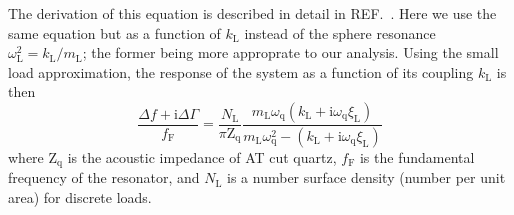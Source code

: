 \documentclass[floatfix,superscriptaddress,a4paper,notitlepage]{revtex4-1}
\newcommand{\Ref}[1]{REF.~\cite{#1}}
\newcommand{\mi}{{\mathrm{i}}}
\newcommand{\xil}{\xi_\mathrm{L}}
\newcommand{\kl}{k_\mathrm{L}}
\newcommand{\ml}{m_\mathrm{L}}
\begin{document}
The derivation of this equation is described in detail in
\Ref{olsson2012probing}.  Here we use the same equation but as a function
of $\kl$ instead of the sphere resonance $\omega_\mathrm{L}^2=\kl/\ml$; the
former being more approprate to our analysis.
Using the small load approximation, the response
of the system as a function of its coupling $\kl$ is then
\begin{equation}
  \frac{\Delta\!f + \mi \Delta \Gamma}{f_\mathrm{F}} = \frac{N_\mathrm{L}}{\pi
    \mathrm{Z}_\mathrm{q}}
  \frac{\ml \omega_\mathrm{q} \left( \kl + \mi
    \omega_\mathrm{q} \xil\right) }
  {\ml \omega_\mathrm{q}^2 - \left(\kl + \mi
    \omega_\mathrm{q} \xil\right)}
  \label{eqn:mastereq}
\end{equation}
where $\mathrm{Z}_\mathrm{q}$ is the acoustic impedance of AT cut quartz,
$f_\mathrm{F}$ is the fundamental frequency of the resonator, and
$N_\mathrm{L}$ is a number surface density (number per unit area) for discrete
loads.



\end{document}
